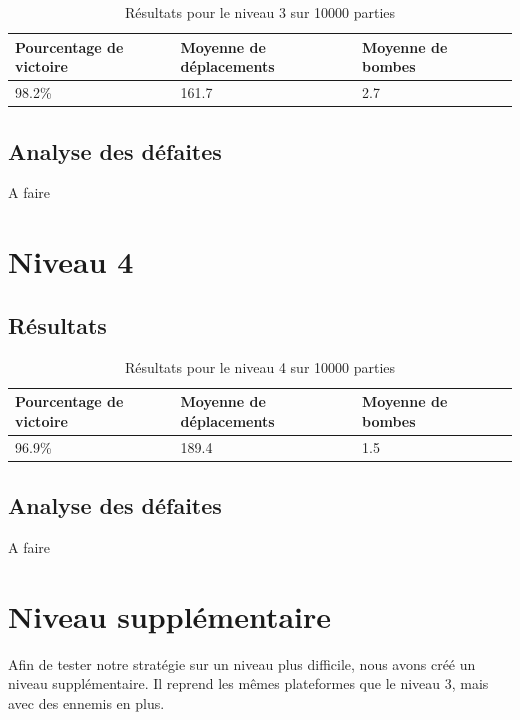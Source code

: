 \begin{table}[!htpb]
    \begin{tabularx}{\textwidth}{lXXX}
        \toprule
        Pourcentage de victoire & Moyenne de déplacements & Moyenne de bombes \\
        \midrule
        98.2\% & 161.7 & 2.7 \\
        \bottomrule
    \end{tabularx}
    \caption{Résultats pour le niveau 3 sur 10000 parties}
    \label{tab:res-niveau-3}
\end{table}

\subsection{Analyse des défaites}

A faire

\newpage

\section{Niveau 4}

\subsection{Résultats}

\begin{table}[!htpb]
    \begin{tabularx}{\textwidth}{lXXX}
        \toprule
        Pourcentage de victoire & Moyenne de déplacements & Moyenne de bombes \\
        \midrule
        96.9\% & 189.4 & 1.5 \\
        \bottomrule
    \end{tabularx}
    \caption{Résultats pour le niveau 4 sur 10000 parties}
    \label{tab:res-niveau-4}
\end{table}

\subsection{Analyse des défaites}

A faire

\section{Niveau supplémentaire}

Afin de tester notre stratégie sur un niveau plus difficile, nous avons créé un niveau supplémentaire.
Il reprend les mêmes plateformes que le niveau 3, mais avec des ennemis en plus.

